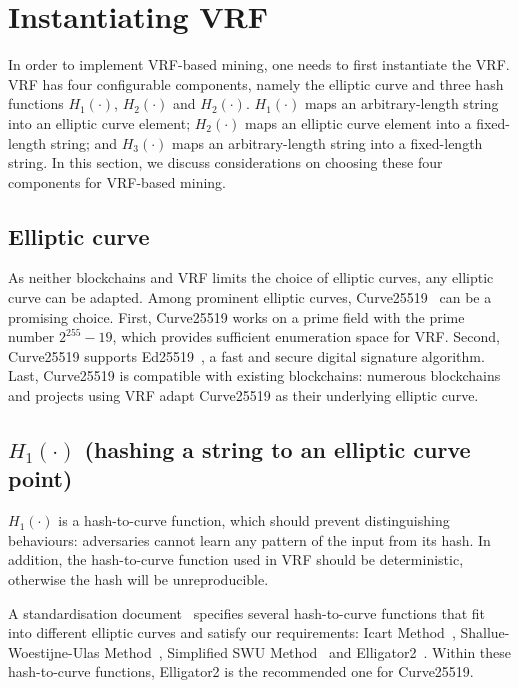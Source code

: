 \section{Instantiating VRF}

In order to implement VRF-based mining, one needs to first instantiate the VRF.
VRF has four configurable components, namely the elliptic curve and three hash functions $H_{1}(\cdot)$, $H_{2}(\cdot)$ and $H_{2}(\cdot)$.
$H_{1}(\cdot)$ maps an arbitrary-length string into an elliptic curve element;
$H_{2}(\cdot)$ maps an elliptic curve element into a fixed-length string; and
$H_{3}(\cdot)$ maps an arbitrary-length string into a fixed-length string.
In this section, we discuss considerations on choosing these four components for VRF-based mining.





\subsection{Elliptic curve}

As neither blockchains and VRF limits the choice of elliptic curves, any elliptic curve can be adapted.
Among prominent elliptic curves, Curve25519~\cite{bernstein2006curve25519} can be a promising choice.
First, Curve25519 works on a prime field with the prime number $2^{255} - 19$, which provides sufficient enumeration space for VRF.
Second, Curve25519 supports Ed25519~\cite{bernstein2012high}, a fast and secure digital signature algorithm.
Last, Curve25519 is compatible with existing blockchains: numerous blockchains and projects using VRF adapt Curve25519 as their underlying elliptic curve.




\subsection{$H_{1}(\cdot)$ (hashing a string to an elliptic curve point)}

$H_{1}(\cdot)$ is a hash-to-curve function, which should prevent distinguishing behaviours: adversaries cannot learn any pattern of the input from its hash.
In addition, the hash-to-curve function used in VRF should be deterministic, otherwise the hash will be unreproducible.

A standardisation document~\cite{scott2019hashing} specifies several hash-to-curve functions that fit into different elliptic curves and satisfy our requirements: Icart Method~\cite{icart2009hash}, Shallue-Woestijne-Ulas Method~\cite{ulas2007rational}, Simplified SWU Method~\cite{brier2010efficient} and Elligator2~\cite{bernstein2013elligator}.
Within these hash-to-curve functions, Elligator2 is the recommended one for Curve25519.




